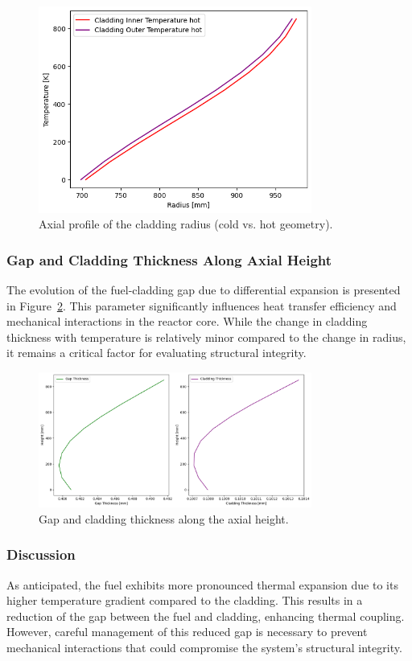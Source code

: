 \begin{figure}[H]
\centering
\includegraphics[width=0.8\textwidth]{3_clad_inout_diff.png}
\caption{Axial profile of the cladding radius (cold vs. hot geometry).}
\label{fig:Cladding_Radius_ColdHot}
\end{figure}

\subsubsection{Gap and Cladding Thickness Along Axial Height}

The evolution of the fuel-cladding gap due to differential expansion is presented in Figure~\ref{fig:Gap_Cladding_Thickness}. This parameter significantly influences heat transfer efficiency and mechanical interactions in the reactor core. While the change in cladding thickness with temperature is relatively minor compared to the change in radius, it remains a critical factor for evaluating structural integrity.

\begin{figure}[H]
\centering
\includegraphics[width=0.8\textwidth]{4_gap_clad_thickness.png}
\caption{Gap and cladding thickness along the axial height.}
\label{fig:Gap_Cladding_Thickness}
\end{figure}

\subsubsection{Discussion}

As anticipated, the fuel exhibits more pronounced thermal expansion due to its higher temperature gradient compared to the cladding. This results in a reduction of the gap between the fuel and cladding, enhancing thermal coupling. However, careful management of this reduced gap is necessary to prevent mechanical interactions that could compromise the system's structural integrity.
